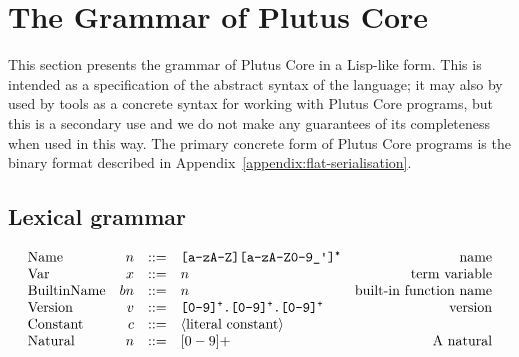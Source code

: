 \section{The Grammar of Plutus Core}
\label{sec:untyped-plc-grammar}
This section presents the grammar of Plutus Core in a Lisp-like form.  This is
intended as a specification of the abstract syntax of the language; it may also
by used by tools as a concrete syntax for working with Plutus Core programs, but
this is a secondary use and we do not make any guarantees of its completeness
when used in this way.  The primary concrete form of Plutus Core programs is the
binary format described in Appendix~\ref{appendix:flat-serialisation}.

\subsection{Lexical grammar}
\label{sec:untyped-plc}
\thispagestyle{plain}
\pagestyle{plain}

\begin{minipage}{\linewidth}
    \centering
    \[\begin{array}{lrclr}

        \textrm{Name}        & n      & ::= & \texttt{[a-zA-Z][a-zA-Z0-9\_\textquotesingle]\textsuperscript{*}}   & \textrm{name}\\

        \textrm{Var}           & x      & ::= & n & \textrm{term variable}\\
        \textrm{BuiltinName}   & bn     & ::= & n & \textrm{built-in function name}\\
        \textrm{Version} & v & ::= & \texttt{[0-9]\textsuperscript{+}.[0-9]\textsuperscript{+}.[0-9]\textsuperscript{+}}& \textrm{version}\\

        \textrm{Constant} & c & ::= & \langle{\textrm{literal constant}}\rangle& \\
        \textrm{Natural}  & n      & ::= & [0-9]+ & \textrm{A natural}\\

    \end{array}\]
    \label{fig:lexical-grammar-untyped}
\end{minipage}%
%
%
%
%
%
%
%



